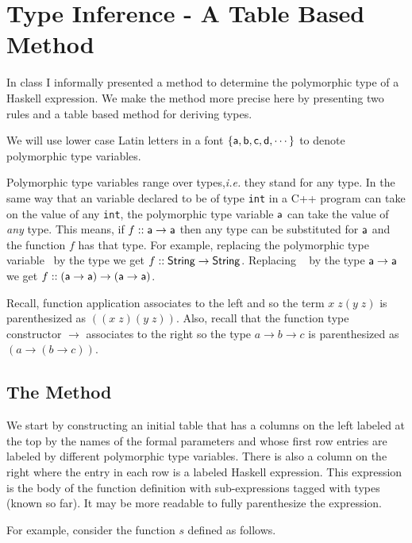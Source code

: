 \documentclass[11pt]{article}
\begin{document}


\section{Type Inference - A Table Based Method}


In class I informally presented a method to determine the polymorphic type of a
Haskell expression.  We make the method more precise here by presenting two
rules and a table based method for deriving types.

We will use lower case Latin letters in a {} font
$\{{\sf{a}},{\sf{b}},{\sf{c}},{\sf{d}},\cdots\}$ to denote polymorphic type variables.

Polymorphic type variables range over types,{\em{i.e.}} they stand for
any type.  In the same way that an variable declared to be of type
{\tt{int}} in a C++ program can take on the value of any {\tt{int}},
the polymorphic type variable ${\sf{a}}$ can take the value of {\it{any}}
type.  This means, if $f::{\sf{a}}\rightarrow{\sf{a}}$ then any type can be
substituted for ${\sf{a}}$ and the function $f$ has that type.  For
example, replacing the polymorphic type variable \sfa~by the type
{} we get $f::{\sf{String}}\rightarrow{\sf{String}}$.
Replacing \sfa~ by the type ${\sf{a}}\rightarrow{\sf{a}}$ we get
$f::({\sf{a}}\rightarrow{\sf{a}})\rightarrow({\sf{a}}\rightarrow{\sf{a}})$.

Recall, function application associates to the left and so the term $x\;z
(y\;z)$ is parenthesized as $((x\;z)(y\;z))$. Also, recall that the function
type constructor $\rightarrow$ associates to the right so the type
$a\rightarrow{}b\rightarrow{}c$ is parenthesized as
$(a\rightarrow{}(b\rightarrow{}c))$.


\subsection{The Method}

We start by constructing an initial table that has a columns on the left
labeled at the top by the names of the formal parameters and whose first row
entries are labeled by different polymorphic type variables. There is also a
column on the right where the entry in each row is a labeled Haskell
expression.  This expression is the body of the function definition with
sub-expressions tagged with types (known so far). It may be more readable to
fully parenthesize the expression.

For example, consider the function $s$ defined as follows.
\end{document}
